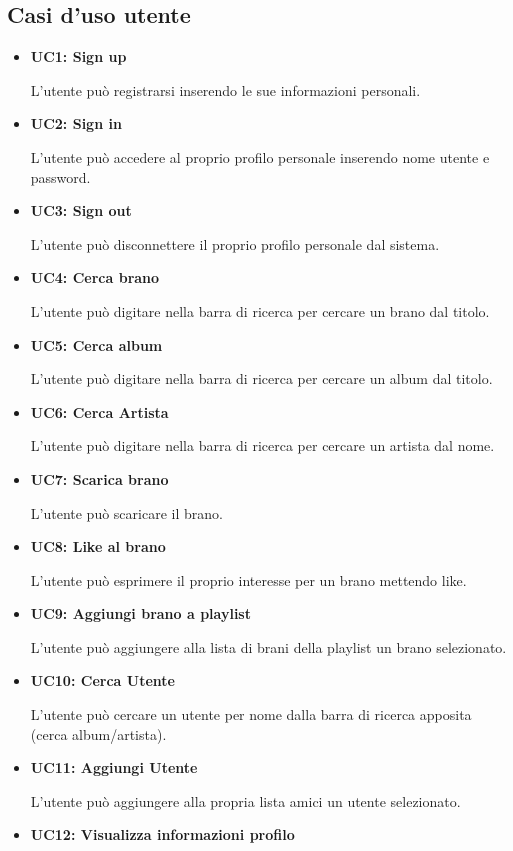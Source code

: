 \vspace{0.5cm}
\subsection{Casi d'uso utente}
\begin{itemize}
      \item \textbf{UC1: Sign up} 
            
      L'utente può registrarsi inserendo le sue informazioni personali.
      \item \textbf{UC2: Sign in}
      
      L'utente può accedere al proprio profilo personale inserendo nome utente e password.
      \item \textbf{UC3: Sign out} 
      
      L'utente può disconnettere il proprio profilo personale dal sistema.     
      \item \textbf{UC4: Cerca brano}
      
      L'utente può digitare nella barra di ricerca per cercare un brano dal titolo.
      \item \textbf{UC5: Cerca album}
      
      L'utente può digitare nella barra di ricerca per cercare un album dal titolo.
      \item \textbf{UC6: Cerca Artista}
      
      L'utente può digitare nella barra di ricerca per cercare un artista dal nome.
      \item \textbf{UC7: Scarica brano}
      
      L'utente può scaricare il brano.
      \item \textbf{UC8: Like al brano} 
      
      L'utente può esprimere il proprio interesse per un brano mettendo like.
      \item \textbf{UC9: Aggiungi brano a playlist}
      
      L'utente può aggiungere alla lista di brani della playlist un brano selezionato.
      \item \textbf{UC10: Cerca Utente} 
      
      L'utente può cercare un utente per nome dalla barra di ricerca apposita (cerca album/artista).
      \item \textbf{UC11: Aggiungi Utente} 
      
      L'utente può aggiungere alla propria lista amici un utente selezionato.
      \item \textbf{UC12: Visualizza informazioni profilo} 
      

\end{itemize}

